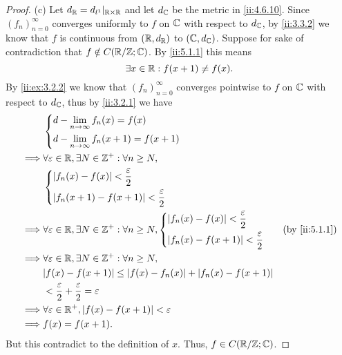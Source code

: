 \begin{proof}{(c)}
  Let \(d_{\mathbb{R}} = d_{l^1}|_{\mathbb{R} \times \mathbb{R}}\) and let \(d_{\mathbb{C}}\) be the metric in \cref{ii:4.6.10}.
  Since \((f_n)_{n = 0}^\infty\) converges uniformly to \(f\) on \(\mathbb{C}\) with respect to \(d_{\mathbb{C}}\), by \cref{ii:3.3.2} we know that \(f\) is continuous from \((\mathbb{R}, d_{\mathbb{R}})\) to \((\mathbb{C}, d_{\mathbb{C}})\).
  Suppose for sake of contradiction that \(f \notin C(\mathbb{R} / \mathbb{Z} ; \mathbb{C})\).
  By \cref{ii:5.1.1} this means
  \[
    \exists x \in \mathbb{R} : f(x + 1) \neq f(x).
  \]
  By \cref{ii:ex:3.2.2} we know that \((f_n)_{n = 0}^\infty\) converges pointwise to \(f\) on \(\mathbb{C}\) with respect to \(d_{\mathbb{C}}\), thus by \cref{ii:3.2.1} we have
  \begin{align*}
             & \begin{dcases}
                 d - \lim_{n \to \infty} f_n(x) = f(x) \\
                 d - \lim_{n \to \infty} f_n(x + 1) = f(x + 1)
               \end{dcases}                                                                       \\
    \implies & \forall \varepsilon \in \R, \exists N \in \Z^+ : \forall n \geq N,                                                 \\
             & \begin{dcases}
                 \abs{f_n(x) - f(x)} < \dfrac{\varepsilon}{2} \\
                 \abs{f_n(x + 1) - f(x + 1)} < \dfrac{\varepsilon}{2}
               \end{dcases}                                                                \\
    \implies & \forall \varepsilon \in \R, \exists N \in \Z^+ : \forall n \geq N, \begin{dcases}
                                                                                    \abs{f_n(x) - f(x)} < \dfrac{\varepsilon}{2} \\
                                                                                    \abs{f_n(x) - f(x + 1)} < \dfrac{\varepsilon}{2}
                                                                                  \end{dcases} &  & \by{ii:5.1.1} \\
    \implies & \forall \varepsilon \in \R, \exists N \in \Z^+ : \forall n \geq N,                                                 \\
             & \abs{f(x) - f(x + 1)} \leq \abs{f(x) - f_n(x)} + \abs{f_n(x) - f(x + 1)}                                           \\
             & < \dfrac{\varepsilon}{2} + \dfrac{\varepsilon}{2} = \varepsilon                                                    \\
    \implies & \forall \varepsilon \in \R^+, \abs{f(x) - f(x + 1)} < \varepsilon                                                  \\
    \implies & f(x) = f(x + 1).
  \end{align*}
  But this contradict to the definition of \(x\).
  Thus, \(f \in C(\mathbb{R} / \mathbb{Z} ; \mathbb{C})\).
\end{proof}

